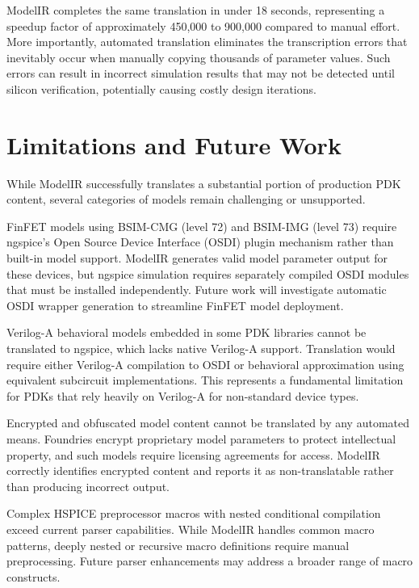 \documentclass[conference]{IEEEtran}
\begin{document}
ModelIR completes the same translation in under 18 seconds, representing a speedup factor of approximately 450,000 to 900,000 compared to manual effort. More importantly, automated translation eliminates the transcription errors that inevitably occur when manually copying thousands of parameter values. Such errors can result in incorrect simulation results that may not be detected until silicon verification, potentially causing costly design iterations.

\section{Limitations and Future Work}
\label{sec:limitations}

While ModelIR successfully translates a substantial portion of production PDK content, several categories of models remain challenging or unsupported.

FinFET models using BSIM-CMG (level 72) and BSIM-IMG (level 73) require ngspice's Open Source Device Interface (OSDI) plugin mechanism rather than built-in model support. ModelIR generates valid model parameter output for these devices, but ngspice simulation requires separately compiled OSDI modules that must be installed independently. Future work will investigate automatic OSDI wrapper generation to streamline FinFET model deployment.

Verilog-A behavioral models embedded in some PDK libraries cannot be translated to ngspice, which lacks native Verilog-A support. Translation would require either Verilog-A compilation to OSDI or behavioral approximation using equivalent subcircuit implementations. This represents a fundamental limitation for PDKs that rely heavily on Verilog-A for non-standard device types.

Encrypted and obfuscated model content cannot be translated by any automated means. Foundries encrypt proprietary model parameters to protect intellectual property, and such models require licensing agreements for access. ModelIR correctly identifies encrypted content and reports it as non-translatable rather than producing incorrect output.

Complex HSPICE preprocessor macros with nested conditional compilation exceed current parser capabilities. While ModelIR handles common macro patterns, deeply nested or recursive macro definitions require manual preprocessing. Future parser enhancements may address a broader range of macro constructs.
\end{document}
